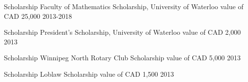 
\vspace*{-0.25cm}

\iffalse


\cvsubsection{International}


\begin{cvhonors}
\cvhonor
{Award} %
{American Society of Hematology, Abstract Achievement Award} %
{value of USD 500} %
{Dec, 2022} %

\end{cvhonors}


\cvsubsection{Domestic}


\begin{cvhonors}

\cvhonor
{Award} %
{Society of Chinese Bioscientists in America, Toronto Chapter, Best Paper award (honourable mention)} %
{value of CAD 100} %
{Feb, 2019} %


\end{cvhonors}
\fi


\begin{cvhonors}

\cvhonor
{Scholarship} %
{Faculty of Mathematics Scholarship, University of Waterloo} %
{value of CAD 25,000} %
{2013-2018} %

\cvhonor
{Scholarship} %
{President’s Scholarship, University of Waterloo} %
{value of CAD 2,000} %
{2013} %

\cvhonor
{Scholarship} %
{Winnipeg North Rotary Club Scholarship} %
{value of CAD 5,000} %
{2013} %

\cvhonor
{Scholarship} %
{Loblaw Scholarship} %
{value of CAD 1,500} %
{2013} %

\end{cvhonors}
